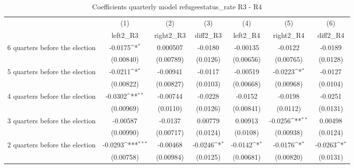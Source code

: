 \begin{table}[!ht]\centering \footnotesize
\def\sym#1{\ifmmode^{#1}\else\(^{#1}\)\fi}
\caption{Coefficients quarterly model refugeestatus\_rate R3 - R4}
\begin{tabular}{l*{6}{c}}
\hline\hline
                    &\multicolumn{1}{c}{(1)}&\multicolumn{1}{c}{(2)}&\multicolumn{1}{c}{(3)}&\multicolumn{1}{c}{(4)}&\multicolumn{1}{c}{(5)}&\multicolumn{1}{c}{(6)}\\
                    &\multicolumn{1}{c}{left2\_R3}&\multicolumn{1}{c}{right2\_R3}&\multicolumn{1}{c}{diff2\_R3}&\multicolumn{1}{c}{left2\_R4}&\multicolumn{1}{c}{right2\_R4}&\multicolumn{1}{c}{diff2\_R4}\\
\hline
 6 quarters before the election&     -0.0175\sym{*}  &    0.000507         &     -0.0180         &    -0.00135         &     -0.0122         &     -0.0189         \\
                    &   (0.00840)         &   (0.00789)         &    (0.0126)         &   (0.00656)         &   (0.00765)         &    (0.0128)         \\
[1em]
 5 quarters before the election&     -0.0211\sym{*}  &    -0.00941         &     -0.0117         &    -0.00519         &     -0.0223\sym{*}  &     -0.0127         \\
                    &   (0.00822)         &   (0.00827)         &    (0.0103)         &   (0.00668)         &   (0.00968)         &    (0.0104)         \\
[1em]
 4 quarters before the election&     -0.0302\sym{**} &    -0.00744         &     -0.0228         &     -0.0152         &     -0.0198         &     -0.0251         \\
                    &   (0.00969)         &    (0.0110)         &    (0.0126)         &   (0.00841)         &    (0.0112)         &    (0.0131)         \\
[1em]
 3 quarters before the election&    -0.00587         &     -0.0137         &     0.00779         &     0.00913         &     -0.0256\sym{**} &     0.00498         \\
                    &   (0.00990)         &   (0.00717)         &    (0.0124)         &    (0.0108)         &   (0.00938)         &    (0.0124)         \\
[1em]
 2 quarters before the election&     -0.0293\sym{***}&    -0.00468         &     -0.0246\sym{*}  &     -0.0142\sym{*}  &     -0.0176\sym{*}  &     -0.0263\sym{*}  \\
                    &   (0.00758)         &   (0.00984)         &    (0.0125)         &   (0.00681)         &   (0.00820)         &    (0.0131)         \\

\end{tabular}
\end{table}
